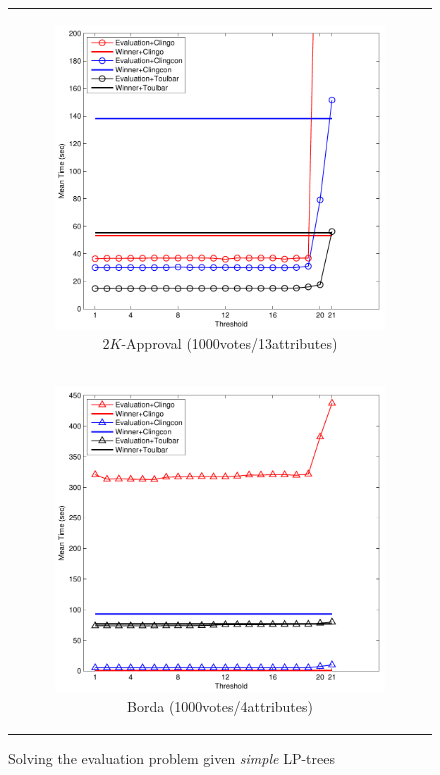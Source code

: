 \begin{figure}[!ht]
\begin{tabular}{c}
\begin{subfigure}[b]{0.5\textwidth}
		\includegraphics[width=\textwidth]{figs/2kAppMSCICP_1000v_13i.pdf}
		\captionsetup{font=scriptsize}
    \caption{$2K$-Approval (1000votes/13attributes)}
		\label{fig:comparison:eval:2}
	\end{subfigure}
  \\
  \begin{subfigure}[b]{0.5\textwidth}
		\includegraphics[width=\textwidth]{figs/bordaMSCICP_1000v_4i.pdf}
		\captionsetup{font=scriptsize}
    \caption{Borda (1000votes/4attributes)}
		\label{fig:comparison:eval:3}
	\end{subfigure}
	\end{tabular}
  \caption{Solving the evaluation problem given \textit{simple} LP-trees}
  \label{fig:eval}
\end{figure}

